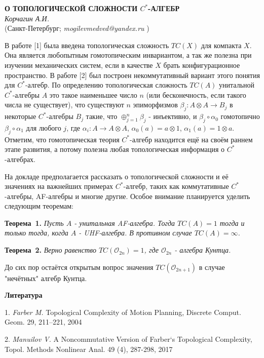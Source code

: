 \begin{center}{ \bf  О ТОПОЛОГИЧЕСКОЙ СЛОЖНОСТИ $C^*$-АЛГЕБР}\\
{\it Корчагин А.И. } \\
(Санкт-Петербург; {\it mogilevmedved@yandex.ru} )
\end{center}


В работе [1] была введена топологическая сложность $TC(X)$ для компакта $X$. Она является любопытным гомотопическим инвариантом, а так же полезна при изучении механических систем, если в качестве $X$ брать конфигурационное пространство. В работе [2] был построен некоммутативный вариант этого понятия для $C^*$-алгебр. По определению топологическая сложность $TC(A)$ унитальной $C^*$-алгебры $A$ это такое наименьшее число $n$ (или бесконечность, если такого числа не существует), что существуют $n$ эпиморфизмов $\beta_j:A\otimes A\to B_j$ в некоторые $C^*$-алгебры $B_j$ такие, что $\oplus_{j=1}^n\beta_j$ - инъективно, и $\beta_j\circ\alpha_0$ гомотопично $\beta_j\circ\alpha_1$ для любого $j$, где $\alpha_i:A\to A\otimes A$, $\alpha_0(a)=a\otimes1$, $\alpha_1(a)=1\otimes a$. Отметим, что гомотопическая теория $C^*$-алгебр находится ещё на своём раннем этапе развития, а потому полезна любая топологическая информация о $C^*$-алгебрах.

На докладе предполагается рассказать о топологической сложности и её значениях на важнейших примерах $C^*$-алгебр, таких как коммутативные $C^*$-алгебры, AF-алгебры и многие другие. Особое внимание планируется уделить следующим теоремам:

\textbf{Теорема~1.} {\it Пусть $A$ - унитальная AF-алгебра. Тогда $TC(A)=1$ тогда и только тогда, когда $A$ - UHF-алгебра. В противном случае $TC(A)=\infty$.}

\textbf{Теорема~2.} {\it Верно равенство $TC(\mathcal{O}_{2n})=1$, где $\mathcal{O}_{2n}$ - алгебра Кунтца.}

До сих пор остаётся открытым вопрос значения $TC(\mathcal{O}_{2n+1})$ в случае "нечётных" алгебр Кунтца.

\smallskip \centerline{\bf Литература}\nopagebreak

1. {\it Farber M.} Topological Complexity of Motion Planning, Discrete Comput. Geom. 29, 211–221, 2004

2. {\it Manuilov V.} A Noncommutative Version of Farber`s Topological Complexity, Topol. Methods Nonlinear
Anal. 49 (4), 287-298, 2017
